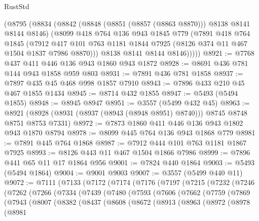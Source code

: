 \begin{lexlean}{RustStd}
\begin{coremodule}
      (@8795
        (@8834
          (@8842
            (@8848 (@8851 (@8857 (@8863 @8870))) @8138 @8141 @8144 @8146)
            (@8099
              @418
              @764
              @136
              @943
              @1845
              @779
              (@7891
                @418
                @764
                @1845
                (@7912
                  @417
                  @101
                  @763
                  @1181
                  @1844
                  @7925
                  (@8126 @374 @11 @467 @1504 @1837 @7986 @8870)))
              @8138
              @8141
              @8144
              @8146)))))
@8921 := @7768 @437 @411 @446 @136 @943 @1860 @943 @1872
@8928 := @8691 @436 @781 @144 @943 @1858 @959 @803
@8931 := @7891 @436 @781 @1858
@8937 := @7897 @435 @45 @468 @998 @1857 @7910
@8943 := @7896 @433 @210 @45 @467 @1855 @1434
@8945 := @8714 @432 @1855
@8947 := @5493 (@5494 @1855)
@8948 := @8945 @8947
@8951 := @3557 (@5499 @432 @45)
@8963 := @8921 (@8928 (@8931 (@8937 (@8943 (@8948 @8951) @8740))) @8745 @8748 @8751 @8753 @7331)
@8972 := @7873 @1860 @411 @446 @136 @943 @1802 @943 @1870 @8794
@8978 := @8099 @445 @764 @136 @943 @1868 @779
@8981 := @7891 @445 @764 @1868
@8987 := @7912 @444 @101 @763 @1181 @1867 @7925
@8993 := @8126 @443 @11 @467 @1504 @1866 @7986
@8999 := @7896 @441 @65 @11 @17 @1864 @956
@9001 := @7824 @440 @1864
@9003 := @5493 (@5494 @1864)
@9004 := @9001 @9003
@9007 := @3557 (@5499 @440 @11)
@9072 := @7111
    (@7133
      (@7172
        (@7174
          (@7176
            (@7197
              (@7215
                (@7232
                  (@7246
                    (@7262
                      (@7266
                        (@7334
                          (@7439
                            (@7480
                              (@7593
                                (@7606
                                  (@7662
                                    (@7759
                                      (@7869
                                        (@7943
                                          (@8007
                                            (@8382
                                              (@8437
                                                (@8608
                                                  (@8672
                                                    (@8913
                                                      (@8963
                                                        (@8972
                                                          (@8978
                                                            (@8981

\end{coremodule}
\end{lexlean}
